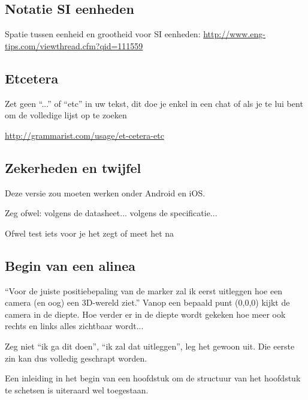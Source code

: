 \subsection{Notatie SI eenheden}

Spatie tussen eenheid en grootheid voor SI eenheden: \url{http://www.eng-tips.com/viewthread.cfm?qid=111559}


\subsection{Etcetera}
Zet geen ``...'' of ``etc'' in uw tekst, dit doe je enkel in een chat of als je te lui bent om de volledige lijst op te zoeken

\url{http://grammarist.com/usage/et-cetera-etc}


\subsection{Zekerheden en twijfel}

Deze versie zou moeten werken onder Android en iOS.

Zeg ofwel: volgens de datasheet... volgens de specificatie...

Ofwel test iets voor je het zegt of meet het na


\subsection{Begin van een alinea}
``Voor de juiste positiebepaling van de marker zal ik eerst uitleggen hoe een camera (en oog) een 3D-wereld ziet.''
Vanop een bepaald punt (0,0,0) kijkt de camera in de diepte. Hoe verder er in de diepte wordt
gekeken hoe meer ook rechts en links alles zichtbaar wordt...

Zeg niet ``ik ga dit doen'', ``ik zal dat uitleggen'', leg het gewoon uit. Die eerste zin kan dus volledig geschrapt worden.

Een inleiding in het begin van een hoofdstuk om de structuur van het hoofdstuk te schetsen is uiteraard wel toegestaan.


